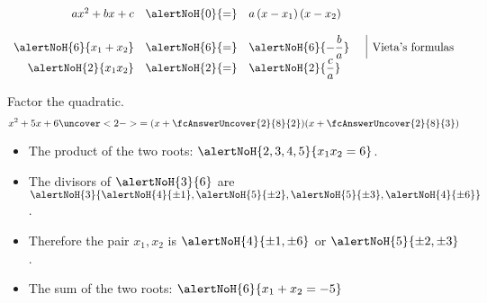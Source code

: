 \begin{frame}
\hfil\hfil $\begin{array}{rcll|l} ax^2+bx+c&\alertNoH{0}{=} &a\left( x- x_1\right) \left(x-x_2\right) \\~\\
\alertNoH{6}{x_1+x_2} &\alertNoH{6}{=} &\displaystyle \alertNoH{6}{-\frac{b}{a}} &&\text{Vieta's formulas}\\
\alertNoH{2}{x_1x_2}&\alertNoH{2}{=}&\displaystyle \alertNoH{2}{\frac{c}{a}}\\
\end{array}
$
\begin{example}
Factor the quadratic.
\[
x^2+5x+6 \uncover<2->{=(x+\fcAnswerUncover{2}{8}{2} )(x+\fcAnswerUncover{2}{8}{3})}
\]
\begin{itemize}
\item<2-> The product of the two roots: $\alertNoH{2,3,4,5}{x_1x_2=6}$.
\item<3-> The divisors of  $\alertNoH{3}{6}$ are $\alertNoH{3}{\alertNoH{4}{\pm 1},\alertNoH{5}{\pm 2}, \alertNoH{5}{\pm 3}, \alertNoH{4}{\pm 6}}$.
\item<4-> Therefore the pair $x_1, x_2$ is $\alertNoH{4}{\pm 1,\pm 6} $ or $\alertNoH{5}{\pm 2,\pm 3}$. 
\item<6-> The sum of the two roots: $\alertNoH{6}{x_1+x_2=-5}$ 
\end{itemize}
\end{example}
\end{frame}